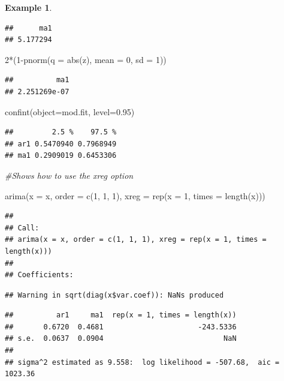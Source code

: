 \documentclass[
]{book}
\newenvironment{Shaded}{\begin{snugshade}}{\end{snugshade}}
\newcommand{\AttributeTok}[1]{\textcolor[rgb]{0.77,0.63,0.00}{#1}}
\newcommand{\CommentTok}[1]{\textcolor[rgb]{0.56,0.35,0.01}{\textit{#1}}}
\newcommand{\DecValTok}[1]{\textcolor[rgb]{0.00,0.00,0.81}{#1}}
\newcommand{\FloatTok}[1]{\textcolor[rgb]{0.00,0.00,0.81}{#1}}
\newcommand{\FunctionTok}[1]{\textcolor[rgb]{0.00,0.00,0.00}{#1}}
\newcommand{\NormalTok}[1]{#1}
\newcommand{\SpecialCharTok}[1]{\textcolor[rgb]{0.00,0.00,0.00}{#1}}
\theoremstyle{definition}
\theoremstyle{definition}
\newtheorem{example}{Example}[chapter]
\theoremstyle{definition}
\theoremstyle{definition}
\theoremstyle{remark}
\begin{document}
\begin{example}
\begin{verbatim}
##      ma1 
## 5.177294
\end{verbatim}

\begin{Shaded}
\begin{Highlighting}[]
  \DecValTok{2}\SpecialCharTok{*}\NormalTok{(}\DecValTok{1}\SpecialCharTok{{-}}\FunctionTok{pnorm}\NormalTok{(}\AttributeTok{q =} \FunctionTok{abs}\NormalTok{(z), }\AttributeTok{mean =} \DecValTok{0}\NormalTok{, }\AttributeTok{sd =} \DecValTok{1}\NormalTok{))}
\end{Highlighting}
\end{Shaded}

\begin{verbatim}
##          ma1 
## 2.251269e-07
\end{verbatim}

\begin{Shaded}
\begin{Highlighting}[]
\FunctionTok{confint}\NormalTok{(}\AttributeTok{object=}\NormalTok{mod.fit, }\AttributeTok{level=}\FloatTok{0.95}\NormalTok{)}
\end{Highlighting}
\end{Shaded}

\begin{verbatim}
##         2.5 %    97.5 %
## ar1 0.5470940 0.7968949
## ma1 0.2909019 0.6453306
\end{verbatim}

\begin{Shaded}
\begin{Highlighting}[]
\CommentTok{\#Shows how to use the xreg option}

  \FunctionTok{arima}\NormalTok{(}\AttributeTok{x =}\NormalTok{ x, }\AttributeTok{order =} \FunctionTok{c}\NormalTok{(}\DecValTok{1}\NormalTok{, }\DecValTok{1}\NormalTok{, }\DecValTok{1}\NormalTok{), }\AttributeTok{xreg =} \FunctionTok{rep}\NormalTok{(}\AttributeTok{x =} \DecValTok{1}\NormalTok{, }\AttributeTok{times =} \FunctionTok{length}\NormalTok{(x)))}
\end{Highlighting}
\end{Shaded}

\begin{verbatim}
## 
## Call:
## arima(x = x, order = c(1, 1, 1), xreg = rep(x = 1, times = length(x)))
## 
## Coefficients:
\end{verbatim}

\begin{verbatim}
## Warning in sqrt(diag(x$var.coef)): NaNs produced
\end{verbatim}

\begin{verbatim}
##          ar1     ma1  rep(x = 1, times = length(x))
##       0.6720  0.4681                      -243.5336
## s.e.  0.0637  0.0904                            NaN
## 
## sigma^2 estimated as 9.558:  log likelihood = -507.68,  aic = 1023.36
\end{verbatim}

\end{example}
\end{document}
